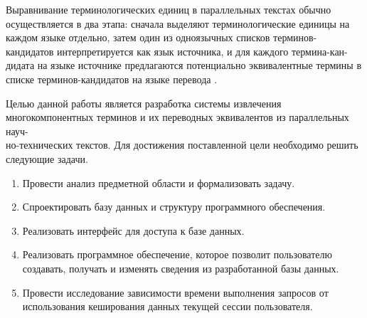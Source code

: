 Выравнивание терминологических единиц в параллельных текстах обычно осуществляется в два этапа: сначала выделяют терминологические единицы на каждом языке отдельно, затем один из одноязычных списков терминов-кандидатов интерпретируется как язык источника, и для каждого термина-кан-\\дидата на языке источнике предлагаются потенциально эквивалентные термины в списке терминов-кандидатов на языке перевода \cite{intro_10}.

Целью данной работы является разработка системы извлечения многокомпонентных терминов и их переводных эквивалентов из параллельных науч-\\но-технических текстов. Для достижения поставленной цели необходимо решить следующие задачи.

\begin{enumerate}[label*=\arabic*.]
	\item Провести анализ предметной области и формализовать задачу.
	\item Спроектировать базу данных и структуру программного обеспечения.
	\item Реализовать интерфейс для доступа к базе данных. 
	\item Реализовать программное обеспечение, которое позволит пользователю создавать, получать и изменять сведения из разработанной базы данных. 
	\item Провести исследование зависимости времени выполнения запросов от использования кеширования данных текущей сессии пользователя.
\end{enumerate}

\pagebreak